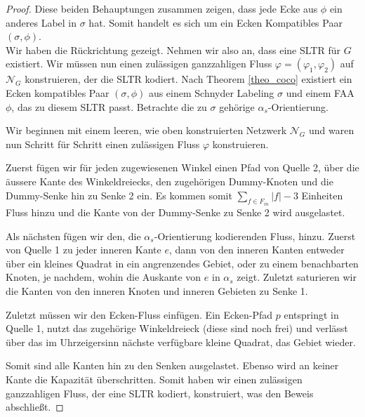 \begin{proof}
Diese beiden Behauptungen zusammen zeigen, dass jede Ecke aus $\phi$ ein anderes Label in $\sigma$ hat. Somit handelt es sich um ein Ecken Kompatibles Paar $(\sigma,\phi)$.\\

Wir haben die Rückrichtung gezeigt. Nehmen wir also an, dass eine SLTR für $G$ existiert. Wir müssen nun einen zulässigen ganzzahligen Fluss $\varphi=(\varphi_1,\varphi_2)$ auf $\mathcal{N}_G$ konstruieren, der die SLTR kodiert. Nach Theorem \ref{theo_coco} existiert ein Ecken kompatibles Paar $(\sigma,\phi)$ aus einem Schnyder Labeling $\sigma$ und einem FAA $\phi$, das zu diesem SLTR passt. Betrachte die zu $\sigma$ gehörige $\alpha_s$-Orientierung.

Wir beginnen mit einem leeren, wie oben konstruierten Netzwerk $\mathcal{N}_G$ und waren nun Schritt für Schritt einen zulässigen Fluss $\varphi$ konstruieren.

Zuerst fügen wir für jeden zugewiesenen Winkel einen Pfad von Quelle 2, über die äussere Kante des Winkeldreiecks, den zugehörigen Dummy-Knoten und die Dummy-Senke hin zu Senke 2 ein. Es kommen somit $\sum_{f \in F_{in}}|f|-3$ Einheiten Fluss hinzu und die Kante von der Dummy-Senke zu Senke 2 wird ausgelastet.

Als nächsten fügen wir den, die $\alpha_s$-Orientierung kodierenden Fluss, hinzu. Zuerst von Quelle 1 zu jeder inneren Kante $e$, dann von den inneren Kanten entweder über ein kleines Quadrat in ein angrenzendes Gebiet, oder zu einem benachbarten Knoten, je nachdem, wohin die Auskante von $e$ in $\alpha_s$ zeigt. Zuletzt saturieren wir die Kanten von den inneren Knoten und inneren Gebieten zu Senke 1.

Zuletzt müssen wir den Ecken-Fluss einfügen. Ein Ecken-Pfad $p$ entspringt in Quelle 1, nutzt das zugehörige Winkeldreieck (diese sind noch frei) und verlässt über das im Uhrzeigersinn nächste verfügbare kleine Quadrat, das Gebiet wieder. 

Somit sind alle Kanten hin zu den Senken ausgelastet. Ebenso wird an keiner Kante die Kapazität überschritten. Somit haben wir einen zulässigen ganzzahligen Fluss, der eine SLTR kodiert, konstruiert, was den Beweis abschließt.

\end{proof}


